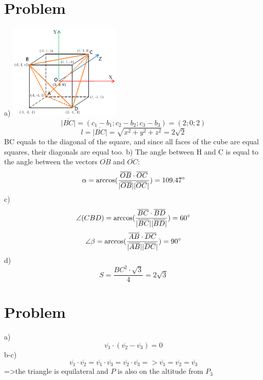 \documentclass[11pt]{article}
\begin{document}
    \section{Problem}
    a)
    \includegraphics[width=200px]{cube.png}
    \[
        \overline{|BC|}=(c_{1}-b_{1};c_{2}-b_{2};c_{3}-b_{3})=(2;0;2)
    \]
    \[
        l=\overline{|BC|}=\sqrt{x^2 + y^2 + z^2}=2\sqrt{2}
    \]
    BC equals to the diagonal of the square, and since all faces of the cube are equal squares, their diagonals are equal too.\newline
    b)
    The angle between H and C is equal to the angle between the vectors $\overline{OB}$ and $\overline{OC}$:
    \[
        \alpha=\arccos(\frac{\overline{OB}\cdot\overline{OC}}{|\overline{OB}| |\overline{OC}|})=109.47\degree
    \]
    c)
    \[
        \angle (CBD) = \arccos(\frac {\overline{BC}\cdot \overline{BD}}{|\overline{BC}| |\overline{BD}|}) = 60\degree
    \]
    \[
        \angle \beta = \arccos(\frac {\overline{AB}\cdot \overline{DC}}{|\overline{AB}| |\overline{DC}|}) = 90 \degree
    \]
    d)
    \[
        S = \frac{BC^2\cdot\sqrt{3}}{4} = 2\sqrt{3}
    \]


    \section{Problem}
    a)
    \[
        \overline{v_1}\cdot(\overline{v_2}-\overline{v_3})=0
    \]
    b-c)
    \[
        \overline{v_1}\cdot\overline{v_2}=\overline{v_1}\cdot\overline{v_3}=\overline{v_2}\cdot\overline{v_3}
    => \overline{v_1}=\overline{v_2}=\overline{v_3} \] =\textgreater the triangle is equilateral and $P$ is also on the altitude from $P_3$
\end{document}
